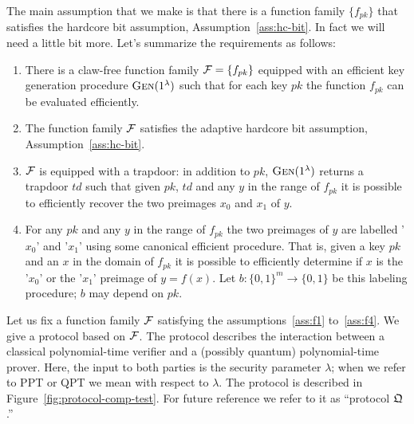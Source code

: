  The main assumption that we make is that there is a function family $\{f_{pk}\}$ that satisfies the hardcore bit assumption, Assumption~\ref{ass:hc-bit}. In fact we will need a little bit more. Let's summarize the requirements as follows:
\begin{enumerate}[label=(\textbf{F.\arabic*})]
\item\label{ass:f1} There is a claw-free function family $\mathcal{F} = \{f_{pk}\}$ equipped with an efficient key generation procedure $\textsc{Gen}(1^\lambda)$ such that for each key $pk$ the function $f_{pk}$ can be evaluated efficiently.
\item \label{ass:f2}The function family $\mathcal{F}$ satisfies the adaptive hardcore bit assumption, Assumption~\ref{ass:hc-bit}.
\item\label{ass:f3} $\mathcal{F}$ is equipped with a trapdoor: in addition to $pk$, $\textsc{Gen}(1^\lambda)$ returns a trapdoor $td$ such that given $pk$, $td$ and any $y$ in the range of $f_{pk}$ it is possible to efficiently recover the two preimages $x_0$ and $x_1$ of $y$. 
\item\label{ass:f4} For any $pk$ and any $y$ in the range of $f_{pk}$ the two preimages of $y$ are labelled '$x_0$' and '$x_1$' using some canonical efficient procedure. That is, given a key $pk$ and an $x$ in the domain of $f_{pk}$ it is possible to efficiently determine if $x$ is the '$x_0$' or the '$x_1$' preimage of $y=f(x)$. Let $b:\{0,1\}^m \to \{0,1\}$ be this labeling procedure; $b$ may depend on $pk$. 
\end{enumerate}
Let us fix a function family $\mathcal{F}$ satisfying the assumptions~\ref{ass:f1} to~\ref{ass:f4}. We give a protocol based on $\mathcal{F}$. The protocol describes the interaction between a classical polynomial-time verifier and a (possibly quantum) polynomial-time prover. Here, the input to both parties is the security parameter $\lambda$; when we refer to PPT or QPT we mean with respect to $\lambda$. The protocol is described in Figure~\ref{fig:protocol-comp-test}. For future reference we refer to it as ``protocol $\mathfrak{Q}$.''

